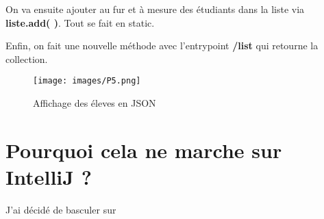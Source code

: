 \documentclass{rapport}
\begin{document}
On va ensuite ajouter au fur et à mesure des étudiants dans la liste via \textbf{liste.add( )}. Tout se fait en static.

Enfin, on fait une nouvelle méthode avec l'entrypoint \textbf{/list} qui retourne la collection. 


\begin{figure}[H]
	\centering
    \texttt{[image: images/P5.png]}
    \caption{Affichage des éleves en JSON}
\end{figure}



\section{Pourquoi cela ne marche sur IntelliJ ?}

J'ai décidé de basculer sur 
\end{document}
